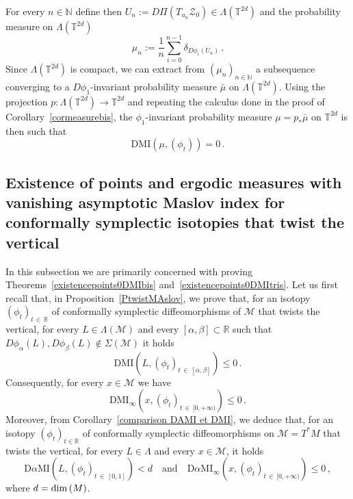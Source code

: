 \documentclass[AHL, Unicode, longabstracts, published]{cedram}
\newcommand*\M{\mathcal{M}}
\newcommand*\cz{\mathcal{Z}}
\newcommand{\DMI}{\mathrm{DMI}}
\newcommand{\MI}{\mathrm{MI}}
\newcommand{\rmD}{\mathrm{D}}
\newcommand*\R{\mathbb{R}}
\newcommand*\N{\mathbb{N}}
\newcommand*\T{\mathbb{T}}
\renewcommand*\dim{{\rm dim}\,}
\begin{document}
For every $n\in\N$ define then $U_n:=D\Pi(T_{u_n}\cz_0)\in\Lambda(\T^{2d})$ and the probability measure on $\Lambda(\T^{2d})$
\[
\mu_n:=\frac 1 n \sum_{i=0}^{n-1}\delta_{D\phi_i(U_n)}\,.
\]
Since $\Lambda(\T^{2d})$ is compact, we can extract from $(\mu_n)_{n\in\N}$ a subsequence converging to a $D\phi_1$-invariant probability measure $\bar\mu$ on $\Lambda(\T^{2d})$. Using the projection $p:\Lambda(\T^{2d})\to\T^{2d}$ and repeating the calculus done in the proof of Corollary~\ref{cormeasurebis}, the $\phi_1$-invariant probability measure { $\mu=p_*\bar\mu$} on $\T^{2d}$ is then such that
\[
\DMI(\mu,(\phi_t))=0\,.
\]



\subsection{Existence of points and ergodic measures with vanishing asymptotic Maslov index for conformally symplectic isotopies that twist the vertical}

In this subsection we are primarily concerned with proving Theorems~\ref{existencepoints0DMIbis} and~\ref{existencepoints0DMItris}. Let us first recall that, in Proposition~\ref{PtwistMAslov}, we prove that, for an isotopy $(\phi_t)_{t\,\in\,\R}$ of conformally symplectic diffeomorphisms of $\M$ that twists the vertical, for every $L\in\Lambda(\M)$ and every $[\alpha,\beta]\subset\R$ such that $D\phi_\alpha(L),D\phi_\beta(L)\notin\Sigma(\M)$ it holds
\[
\DMI\left(L,(\phi_t)_{t\,\in\,[\alpha,\beta]}\right)\leq 0\,.
\]
Consequently, for every $x\in \M$ we have
\[
\DMI_\infty\left(x,(\phi_t)_{t\,\in\,[0,+\infty)}\right)\leq 0\,.
\]
Moreover, from Corollary~\ref{comparison DAMI et DMI}, we deduce that, for an isotopy $(\phi_t)_{t\in\R}$ of conformally symplectic diffeomorphisms on $\M=T^*M$ that twists the vertical, for every $L\in\Lambda$ and every $x\in \M$, it holds
\[
\rmD\alpha\MI\left(L, (\phi_t)_{t\,\in\,[0,1]}\right)< d\quad\text{and}\quad \rmD\alpha\MI_\infty\left(x,(\phi_t)_{t\,\in\,[0,+\infty)}\right)\leq 0\,,
\]
where $d=\dim(M)$.
\end{document}

